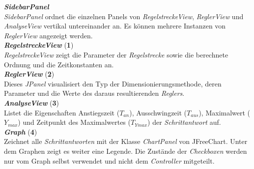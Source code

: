 \textit{\textbf{SidebarPanel}}\\
\textit{SidebarPanel} ordnet die einzelnen Panels von \textit{RegelstreckeView}, \textit{ReglerView} und \textit{AnalyseView} vertikal untereinander an. Es können mehrere Instanzen von \textit{ReglerView} angezeigt werden.\\

\textit{\textbf{RegelstreckeView}} (\textbf{1})\\
\textit{RegelstreckeView}  zeigt die Parameter der \textit{Regelstrecke} sowie die berechnete Ordnung und die Zeitkonstanten an.\\

\textit{\textbf{ReglerView}} (\textbf{2})\\
Dieses \textit{JPanel} visualisiert den Typ der Dimensionierungsmethode, deren Parameter und die Werte des daraus resultierenden \textit{Reglers}.\\

\textit{\textbf{AnalyseView}} (\textbf{3})\\
Listet die Eigenschaften Anstiegszeit ($T_{an}$), Ausschwingzeit ($T_{aus}$), Maximalwert ($Y_{max}$) und Zeitpunkt des Maximalwertes ($T_{Ymax}$) der \textit{Schrittantwort} auf.\\

\textit{\textbf{Graph}} (\textbf{4})\\
Zeichnet alle \textit{Schrittantworten} mit der Klasse \textit{ChartPanel} von JFreeChart. Unter dem Graphen zeigt es weiter eine Legende. Die Zustände der \textit{Checkboxen} werden nur vom Graph selbst verwendet und nicht dem \textit{Controller} mitgeteilt.

